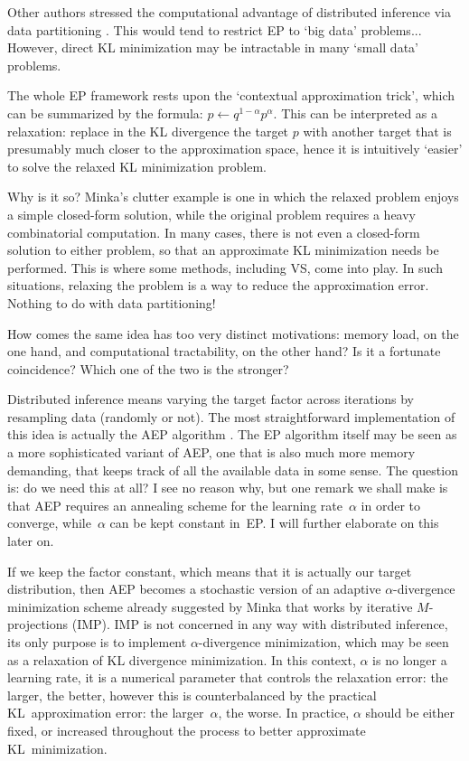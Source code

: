 \documentclass{article}
\begin{document}
Other authors stressed the computational advantage of distributed inference via data partitioning \cite{Vehtari-14}. This would tend to restrict EP to `big data' problems... However, direct KL minimization may be intractable in many `small data' problems. 

The whole EP framework rests upon the `contextual approximation trick', which can be summarized by the formula: $p\leftarrow q^{1-\alpha}p^\alpha$. This can be interpreted as a relaxation: replace in the KL divergence the target $p$ with another target that is presumably much closer to the approximation space, hence it is intuitively `easier' to solve the relaxed KL minimization problem.

Why is it so? Minka's clutter example is one in which the relaxed problem enjoys a simple closed-form solution, while the original problem requires a heavy combinatorial computation. In many cases, there is not even a closed-form solution to either problem, so that an approximate KL minimization needs be performed. This is where some methods, including VS, come into play. In such situations, relaxing the problem is a way to reduce the approximation error. Nothing to do with data partitioning!

How comes the same idea has too very distinct motivations: memory load, on the one hand, and computational tractability, on the other hand? Is it a fortunate coincidence? Which one of the two is the stronger?


Distributed inference means varying the target factor across iterations by resampling data (randomly or not). The most straightforward implementation of this idea is actually the AEP algorithm \cite{Dehaene-18}. The EP algorithm itself may be seen as a more sophisticated variant of AEP, one that is also much more memory demanding, that keeps track of all the available data in some sense. The question is: do we need this at all? I see no reason why, but one remark we shall make is that AEP requires an annealing scheme for the learning rate~$\alpha$ in order to converge, while~$\alpha$ can be kept constant in~EP. I will further elaborate on this later on.

If we keep the factor constant, which means that it is actually our target distribution, then AEP becomes a stochastic version of an adaptive $\alpha$-divergence minimization scheme already suggested by Minka \cite{Minka-05} that works by iterative $M$-projections (IMP). IMP is not concerned in any way with distributed inference, its only purpose is to implement $\alpha$-divergence minimization, which may be seen as a relaxation of KL divergence minimization. In this context, $\alpha$ is no longer a learning rate, it is a numerical parameter that controls the relaxation error: the larger, the better, however this is counterbalanced by the practical KL~approximation error: the larger~$\alpha$, the worse. In practice, $\alpha$ should be either fixed, or increased throughout the process to better approximate KL~minimization. 
\end{document}
